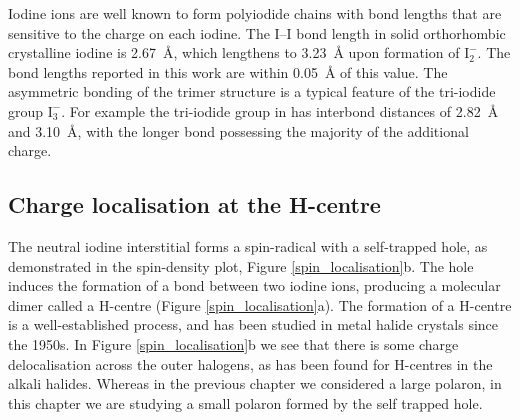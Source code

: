 Iodine ions are well known to form polyiodide chains with bond lengths that are sensitive to the charge on each iodine.
The I--I bond length in solid orthorhombic crystalline iodine is \SI{2.67}{\angstrom}, which lengthens to \SI{3.23}{\angstrom} upon formation of $\mathrm{I}_2^-$.\autocite{Chen1985} The bond lengths reported in this work are within \SI{0.05}{\angstrom} of this value.
The asymmetric bonding of the trimer structure is a typical feature of the tri-iodide group $\mathrm{I}_3^-$. For example the tri-iodide group in  has interbond distances of \SI{2.82}{\angstrom} and \SI{3.10}{\angstrom}, with the longer bond possessing the majority of the additional charge.\autocite{Finney1973}

\subsection{Charge localisation at the H-centre} \label{ss:chglocal}
The neutral iodine interstitial forms a spin-radical with a self-trapped hole, as demonstrated in the spin-density plot, Figure \ref{spin_localisation}b.
The hole induces the formation of a bond between two iodine ions, producing a molecular dimer called a H-centre (Figure \ref{spin_localisation}a). The formation of a H-centre is a well-established process, and has been studied in metal halide crystals since the 1950s.\autocite{Castner1957} In Figure \ref{spin_localisation}b we see that there is some charge delocalisation across the outer halogens, as has been found for H-centres in the alkali halides.\autocite{Shluger1995}
Whereas in the previous chapter we considered a large polaron, in this chapter we are studying a small polaron formed by the self trapped hole.

